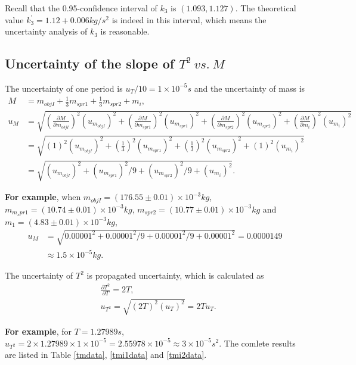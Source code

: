     Recall that the 0.95-confidence interval of $k_3$ is $(1.093,1.127)$. The theoretical value $k_3^{'}=1.12+0.006 kg/s^2$ is indeed in this interval, which means the uncertainty analysis of $k_3$ is reasonable.\\
    
\subsection{Uncertainty of the slope of $T^2\ vs.\ M$}
    The uncertainty of one period is $u_T/10=1\times10^{-5}s$ and the uncertainty of mass is
    \[
    \begin{split}
        M&=m_{objI}+\frac{1}{3}m_{spr1}+\frac{1}{3}m_{spr2}+m_i,\\
        u_M&=\sqrt{
         (\frac{\partial M}{\partial m_{objI}})^2(u_{m_{objI}})^2
        +(\frac{\partial M}{\partial m_{spr1}})^2(u_{m_{spr1}})^2
        +(\frac{\partial M}{\partial m_{spr2}})^2(u_{m_{spr2}})^2
        +(\frac{\partial M}{\partial m_i})^2(u_{m_i})^2
        }\\
        &=\sqrt{
         (1)^2(u_{m_{objI}})^2
        +(\frac{1}{3})^2(u_{m_{spr1}})^2
        +(\frac{1}{3})^2(u_{m_{spr2}})^2
        +(1)^2(u_{m_i})^2
        }\\
        &=\sqrt{(u_{m_{objI}})^2+(u_{m_{spr1}})^2/9+(u_{m_{spr2}})^2/9+(u_{m_i})^2}.
    \end{split}
    \]

    \textbf{For example}, when $m_{objI}=(176.55\pm0.01)\times10^{-3}kg$, $m_{m_spr1}=(10.74\pm0.01)\times10^{-3}kg$, $m_{spr2}=(10.77\pm0.01)\times10^{-3}kg$ and $m_1=(4.83\pm0.01)\times10^{-3}kg$,
    \[
    \begin{split}
        u_M&=\sqrt{0.00001^2+0.00001^2/9+0.00001^2/9+0.00001^2}=0.0000149\\
        &\approx 1.5\times10^{-5}kg.
    \end{split}
    \]

    The uncertainty of $T^2$ is propagated uncertainty, which is calculated as
    \[
    \begin{split}
        &\frac{\partial T^2}{\partial T}=2T,\\
        &u_{T^2}=\sqrt{(2T)^2(u_T)^2}=2Tu_T.
    \end{split}
    \]

    \textbf{For example}, for $T=1.27989s$, $u_{T^2}=2\times1.27989\times1\times10^{-5}=2.55978\times10^{-5}\approx3\times10^{-5}s^2$. The comlete results are listed in Table \ref{tmdata}, \ref{tmi1data} and \ref{tmi2data}.

